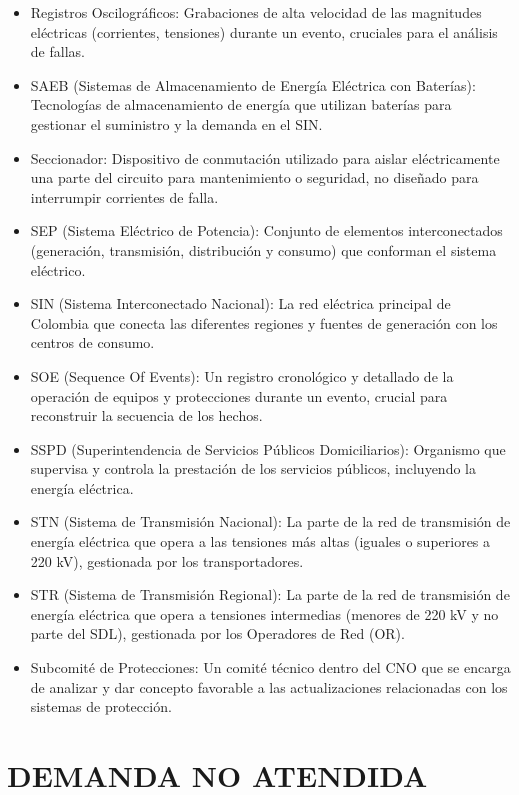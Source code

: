 \documentclass[a5paper]{book}%
\begin{document}
{\begin{itemize}
  \item Registros Oscilográficos: Grabaciones de alta velocidad de las magnitudes eléctricas (corrientes, tensiones) durante un evento, cruciales para el análisis de fallas.
  \item SAEB (Sistemas de Almacenamiento de Energía Eléctrica con Baterías): Tecnologías de almacenamiento de energía que utilizan baterías para gestionar el suministro y la demanda en el SIN.
  \item Seccionador: Dispositivo de conmutación utilizado para aislar eléctricamente una parte del circuito para mantenimiento o seguridad, no diseñado para interrumpir corrientes de falla.
  \item SEP (Sistema Eléctrico de Potencia): Conjunto de elementos interconectados (generación, transmisión, distribución y consumo) que conforman el sistema eléctrico.
  \item SIN (Sistema Interconectado Nacional): La red eléctrica principal de Colombia que conecta las diferentes regiones y fuentes de generación con los centros de consumo.
  \item SOE (Sequence Of Events): Un registro cronológico y detallado de la operación de equipos y protecciones durante un evento, crucial para reconstruir la secuencia de los hechos.
  \item SSPD (Superintendencia de Servicios Públicos Domiciliarios): Organismo que supervisa y controla la prestación de los servicios públicos, incluyendo la energía eléctrica.
  \item STN (Sistema de Transmisión Nacional): La parte de la red de transmisión de energía eléctrica que opera a las tensiones más altas (iguales o superiores a 220 kV), gestionada por los transportadores.
  \item STR (Sistema de Transmisión Regional): La parte de la red de transmisión de energía eléctrica que opera a tensiones intermedias (menores de 220 kV y no parte del SDL), gestionada por los Operadores de Red (OR).
  \item Subcomité de Protecciones: Un comité técnico dentro del CNO que se encarga de analizar y dar concepto favorable a las actualizaciones relacionadas con los sistemas de protección.
  \end{itemize}}


  \section{DEMANDA NO ATENDIDA}
\end{document}
